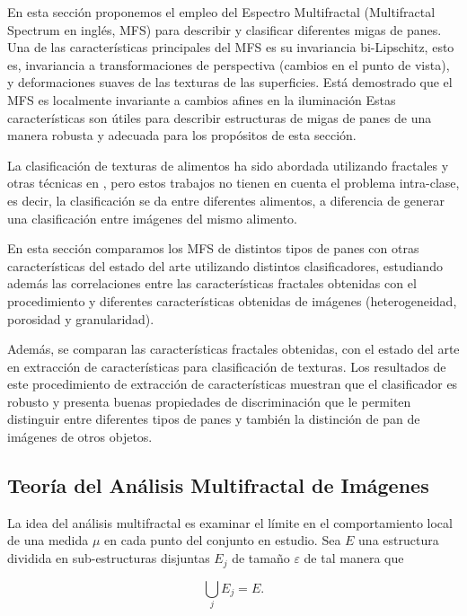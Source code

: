 En esta sección proponemos el empleo del Espectro Multifractal (Multifractal Spectrum en inglés, \acrshort{MFS}) para describir y clasificar diferentes migas de panes.
Una de las características principales del MFS es su invariancia bi-Lipschitz, esto es,
invariancia a transformaciones de perspectiva (cambios en el punto de vista), y deformaciones suaves de las texturas de las superficies.
Está demostrado que el MFS es localmente invariante a cambios afines en la iluminación
Estas características son útiles para describir estructuras de migas de panes de una manera robusta y adecuada para los propósitos de esta sección.

La clasificación de texturas de alimentos ha sido abordada utilizando fractales y otras técnicas en \cite{Zong2010,Bosch2011}, pero estos trabajos no tienen en cuenta el problema intra-clase, es decir, la clasificación se da entre diferentes alimentos, a diferencia de generar una clasificación entre imágenes del mismo alimento.


En esta sección comparamos los MFS de distintos tipos de panes con otras características del estado del arte utilizando distintos clasificadores, estudiando además las correlaciones entre las características fractales obtenidas con el procedimiento y diferentes características obtenidas de imágenes (heterogeneidad, porosidad y granularidad).

Además, se comparan las características fractales obtenidas, con el estado del arte en extracción de características para clasificación de texturas.
Los resultados de este procedimiento de extracción de características muestran que el clasificador es robusto y presenta buenas propiedades de discriminación que le permiten distinguir entre diferentes tipos de panes y también la distinción de pan de imágenes de otros objetos.

\subsection{Teoría del Análisis Multifractal de Imágenes}

La idea del análisis multifractal es examinar el límite en el comportamiento local de una medida $\mu$ en cada punto del conjunto en estudio.
Sea $E$ una estructura dividida en sub-estructuras disjuntas $E_{j}$ de tamaño $\varepsilon$ de tal manera que

\begin{equation}
\displaystyle\bigcup_{j}E_{j} = E.
\end{equation}


